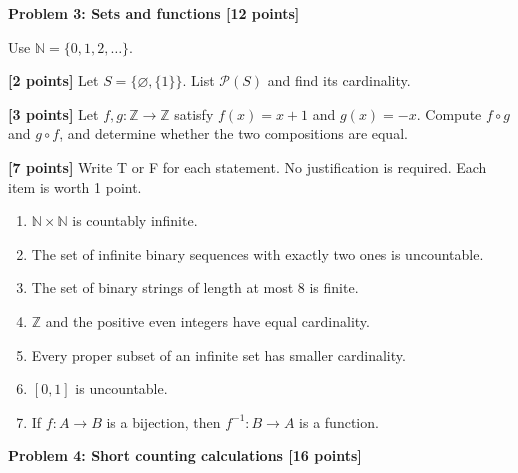 \documentclass[12pt,letterpaper]{article}
\newcommand{\problemheading}[2][5\baselineskip]{\Needspace{#1}\par\noindent\hspace*{-0.625in}\textbf{#2}\par\nobreak\vspace{0.3em}}
\newcommand{\examspace}[1]{\par\vspace*{#1cm}}
\begin{document}
\clearpage
\vspace*{0.21in}
\problemheading{Problem 3: Sets and functions [12 points]}
\begin{list}{}{\setlength{\leftmargin}{0.25in}\setlength{\rightmargin}{0.25in}}\item[]
Use $\mathbb N=\{0,1,2,\ldots\}$.
\begin{description}[font=\normalfont,leftmargin=1.2em,labelsep=0.4em]
\item[(a)] \textbf{[2 points]} Let $S=\{\varnothing,\{1\}\}$. List $\mathcal P(S)$ and find its cardinality.
\examspace{3}
\Needspace{\dimexpr 3cm+4\baselineskip\relax}
\item[(b)] \textbf{[3 points]} Let $f,g:\mathbb Z\to\mathbb Z$ satisfy $f(x)=x+1$ and $g(x)=-x$. Compute $f\circ g$ and $g\circ f$, and determine whether the two compositions are equal.
\examspace{3}
\Needspace{\dimexpr 1cm+4\baselineskip\relax}
\item[(c)] \textbf{[7 points]} Write T or F for each statement. No justification is required. Each item is worth 1 point.\begin{enumerate}[label=(\roman*)]\item $\mathbb N\times\mathbb N$ is countably infinite.\item The set of infinite binary sequences with exactly two ones is uncountable.\item The set of binary strings of length at most 8 is finite.\item $\mathbb Z$ and the positive even integers have equal cardinality.\item Every proper subset of an infinite set has smaller cardinality.\item $[0,1]$ is uncountable.\item If $f:A\to B$ is a bijection, then $f^{-1}:B\to A$ is a function.\end{enumerate}
\examspace{1}
\end{description}
\end{list}
\clearpage
\vspace*{0.21in}
\problemheading{Problem 4: Short counting calculations [16 points]}
\end{document}
